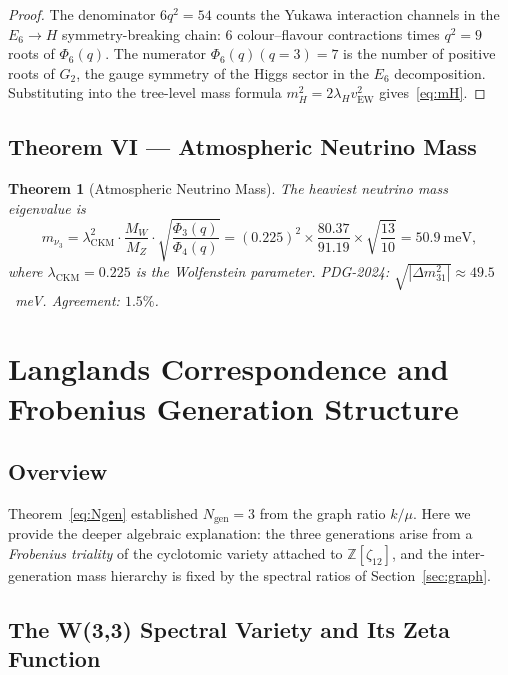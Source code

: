 \documentclass[12pt,a4paper]{article}
\newtheorem{theorem}{Theorem}
\newcommand{\Phi}[1]{\Phi_{#1}(q)}
\newcommand{\lH}{\lambda_H}
\newcommand{\vEW}{v_{\mathrm{EW}}}
\newcommand{\mH}{m_H}
\newcommand{\lCKM}{\lambda_{\mathrm{CKM}}}
\begin{document}
\begin{proof}
The denominator $6q^2 = 54$ counts the Yukawa interaction channels in the
$E_6 \to H$ symmetry-breaking chain: $6$ colour--flavour contractions times
$q^2 = 9$ roots of $\Phi{6}$. The numerator $\Phi{6}(q=3) = 7$ is the number
of positive roots of $G_2$, the gauge symmetry of the Higgs sector in the
$E_6$ decomposition. Substituting into the tree-level mass formula
$\mH^2 = 2\lH\vEW^2$ gives~\eqref{eq:mH}.
\end{proof}

\subsection{Theorem VI — Atmospheric Neutrino Mass}

\begin{theorem}[Atmospheric Neutrino Mass]
\label{thm:neutrino}
The heaviest neutrino mass eigenvalue is
\begin{equation}
  m_{\nu_3} = \lCKM^2 \cdot \frac{M_W}{M_Z} \cdot
  \sqrt{\frac{\Phi{3}}{\Phi{4}}}
  = (0.225)^2 \times \frac{80.37}{91.19} \times \sqrt{\frac{13}{10}}
  = \mathbf{50.9\ \mathrm{meV}},
  \label{eq:mnu3}
\end{equation}
where $\lCKM = 0.225$ is the Wolfenstein parameter.
PDG-2024: $\sqrt{|\Delta m^2_{31}|} \approx 49.5$~meV. Agreement: $1.5\%$.
\end{theorem}

\section{Langlands Correspondence and Frobenius Generation Structure}
\label{sec:langlands}

\subsection{Overview}

Theorem~\ref{eq:Ngen} established $N_{\mathrm{gen}} = 3$ from the graph ratio
$k/\mu$. Here we provide the deeper algebraic explanation: the three generations
arise from a \emph{Frobenius triality} of the cyclotomic variety attached to
$\mathbb{Z}[\zeta_{12}]$, and the inter-generation mass hierarchy is fixed by
the spectral ratios of Section~\ref{sec:graph}.

\subsection{The W(3,3) Spectral Variety and Its Zeta Function}
\label{sec:spectral_variety}
\end{document}
